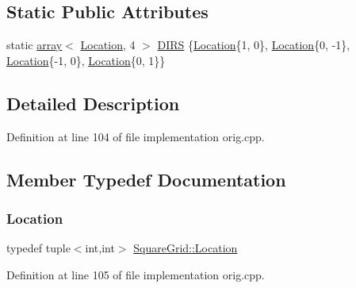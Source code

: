 \subsection*{Static Public Attributes}
\begin{DoxyCompactItemize}
\item 
static \mbox{\hyperlink{glad_8h_a52f38e7d822a46377fde7a02708eedb1}{array}}$<$ \mbox{\hyperlink{struct_square_grid_a2c9a2cbd3912aa48ac97289abc3f1c0f}{Location}}, 4 $>$ \mbox{\hyperlink{struct_square_grid_aac91cba6573640c545485ed054089c87}{D\+I\+RS}} \{\mbox{\hyperlink{struct_square_grid_a2c9a2cbd3912aa48ac97289abc3f1c0f}{Location}}\{1, 0\}, \mbox{\hyperlink{struct_square_grid_a2c9a2cbd3912aa48ac97289abc3f1c0f}{Location}}\{0, -\/1\}, \mbox{\hyperlink{struct_square_grid_a2c9a2cbd3912aa48ac97289abc3f1c0f}{Location}}\{-\/1, 0\}, \mbox{\hyperlink{struct_square_grid_a2c9a2cbd3912aa48ac97289abc3f1c0f}{Location}}\{0, 1\}\}
\end{DoxyCompactItemize}


\subsection{Detailed Description}


Definition at line 104 of file implementation orig.\+cpp.



\subsection{Member Typedef Documentation}
\mbox{\label{struct_square_grid_a2c9a2cbd3912aa48ac97289abc3f1c0f}} 
\subsubsection{\texorpdfstring{Location}{Location}\hspace{0.1cm}{\footnotesize\ttfamily [1/2]}}
{\footnotesize\ttfamily typedef tuple$<$int,int$>$ \mbox{\hyperlink{struct_square_grid_a2c9a2cbd3912aa48ac97289abc3f1c0f}{Square\+Grid\+::\+Location}}}



Definition at line 105 of file implementation orig.\+cpp.

\mbox{\label{struct_square_grid_a2c9a2cbd3912aa48ac97289abc3f1c0f}} 
